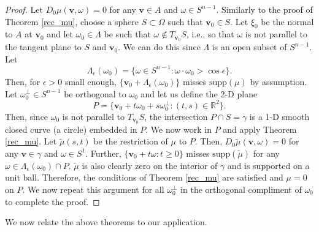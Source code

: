 \documentclass[a4paper,12pt]{amsart}
\numberwithin{equation}{section}
\theoremstyle{plain}
\numberwithin{theorem}{section}
\theoremstyle{definition}
\theoremstyle{remark}
\theoremstyle{remark}
\theoremstyle{remark}
\newcommand{\vv}{{\mathbf{v}}}
\begin{document}
{\begin{proof}
Let $D_0\mu(\vv,\omega) = 0$ for any $\vv\in A$ and $\omega \in S^{n-1}$. Similarly to the proof of Theorem \ref{rec_mu}, choose a sphere $S \subset \Omega$ such that $\vv_0 \in S$. Let $\xi_0$ be the normal to $A$ at $\vv_0$ and let $\omega_0 \in \Lambda$ be such that $\omega \notin T_{\vv_0} S$, i.e., so that $\omega$ is not parallel to the tangent plane to $S$ and $\vv_0$. We can do this since $\Lambda$ is an open subset of $S^{n-1}$. Let
$$\Lambda_\epsilon(\omega_0) = \{ \omega\in S^{n-1} : \omega \cdot \omega_0 > \cos \epsilon\}.$$
Then, for $\epsilon > 0$ small enough, $\{\vv_0 + \Lambda_\epsilon(\omega_0)\}$ misses $\text{supp}(\mu)$  by assumption. Let $\omega_0^{\perp} \in S^{n-1}$ be orthogonal to $\omega_0$ and let us define the 2-D plane
$$P = \{\vv_0 + t\omega_0 + s\omega_0^{\perp} : (t,s) \in \mathbb{R}^2\}.$$
Then, since $\omega_0$ is not parallel to $T_{\vv_0}S$, the intersection $P \cap S = \gamma$ is a 1-D smooth closed curve (a circle) embedded in $P$. We now work in $P$ and apply Theorem \ref{rec_mu}. Let $\tilde{\mu}(s,t)$ be the restriction of $\mu$ to $P$. Then, $D_0\tilde{\mu}(\vv,\omega) = 0$ for any $\vv \in \gamma$ and $\omega \in S^1$. Further, $\{\vv_0 + t\omega : t\geq 0\}$ misses $\text{supp}(\tilde{\mu})$ for any $\omega \in \Lambda_\epsilon(\omega_0) \cap P$. $\tilde{\mu}$ is also clearly zero on the interior of $\gamma$ and is supported on a unit ball. Therefore, the conditions of Theorem \ref{rec_mu} are satisfied and $\mu = 0$ on $P$. We now repeat this argument for all $\omega_0^{\perp}$ in the orthogonal compliment of $\omega_0$ to complete the proof.
\end{proof}

We now relate the above theorems to our application.

}
\end{document}
